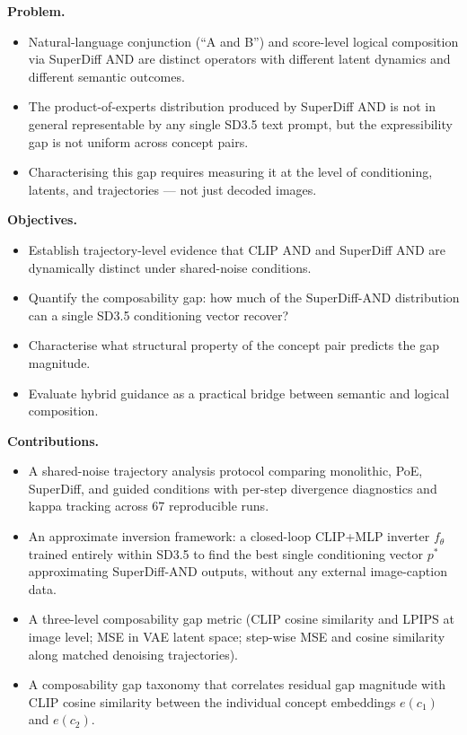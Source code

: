 \documentclass[runningheads]{llncs}
\begin{document}
\textbf{Problem.}
\begin{itemize}
  \item Natural-language conjunction (``A and B'') and score-level logical
    composition via SuperDiff AND are distinct operators with different
    latent dynamics and different semantic outcomes.
  \item The product-of-experts distribution produced by SuperDiff AND is not
    in general representable by any single SD3.5 text prompt, but the
    expressibility gap is not uniform across concept pairs.
  \item Characterising this gap requires measuring it at the level of
    conditioning, latents, and trajectories --- not just decoded images.
\end{itemize}

\textbf{Objectives.}
\begin{itemize}
  \item Establish trajectory-level evidence that CLIP AND and SuperDiff AND
    are dynamically distinct under shared-noise conditions.
  \item Quantify the composability gap: how much of the SuperDiff-AND
    distribution can a single SD3.5 conditioning vector recover?
  \item Characterise what structural property of the concept pair predicts
    the gap magnitude.
  \item Evaluate hybrid guidance as a practical bridge between semantic and
    logical composition.
\end{itemize}

\textbf{Contributions.}
\begin{itemize}
  \item A shared-noise trajectory analysis protocol comparing monolithic,
    PoE, SuperDiff, and guided conditions with per-step divergence diagnostics
    and kappa tracking across 67 reproducible runs.
  \item An approximate inversion framework: a closed-loop CLIP+MLP inverter
    $f_\theta$ trained entirely within SD3.5 to find the best single
    conditioning vector $p^*$ approximating SuperDiff-AND outputs, without
    any external image-caption data.
  \item A three-level composability gap metric (CLIP cosine similarity and
    LPIPS at image level; MSE in VAE latent space; step-wise MSE and cosine
    similarity along matched denoising trajectories).
  \item A composability gap taxonomy that correlates residual gap magnitude
    with CLIP cosine similarity between the individual concept embeddings
    $e(c_1)$ and $e(c_2)$.
\end{itemize}
\end{document}
